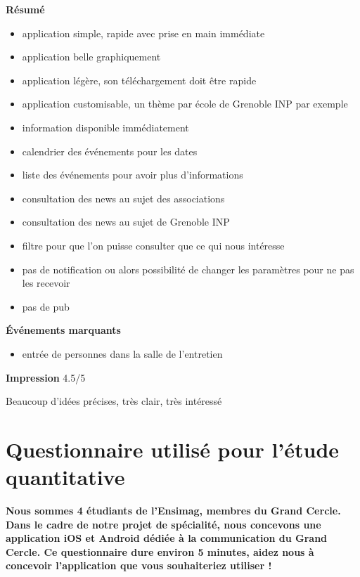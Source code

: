 \documentclass[a4paper, 11px]{article}
\begin{document}
\textbf{Résumé}
	\begin{itemize}
		\item application simple, rapide avec prise en main immédiate
		\item application belle graphiquement
		\item application légère, son téléchargement doit être rapide
		\item application customisable, un thème par école de Grenoble INP par exemple
		\item information disponible immédiatement
		\item calendrier des événements pour les dates
		\item liste des événements pour avoir plus d'informations
		\item consultation des news au sujet des associations
		\item consultation des news au sujet de Grenoble INP
		\item filtre pour que l'on puisse consulter que ce qui nous intéresse
		\item pas de notification ou alors possibilité de changer les paramètres pour ne pas les recevoir
		\item pas de pub
	\end{itemize}

\vspace{.25cm}
\textbf{Événements marquants}
	\begin{itemize}
		\item entrée de personnes dans la salle de l'entretien
	\end{itemize}

\vspace{.25cm}
\textbf{Impression} 4.5/5 

Beaucoup d'idées précises, très clair, très intéressé

\newpage

\section{Questionnaire utilisé pour l'étude quantitative}

 \textbf {\large Nous sommes 4 étudiants de l'Ensimag, membres du Grand Cercle. Dans le cadre de notre projet de spécialité, nous concevons une application iOS et Android dédiée à la communication du Grand Cercle. Ce questionnaire dure environ 5 minutes, aidez nous à concevoir l'application que vous souhaiteriez utiliser !}\\
\end{document}
